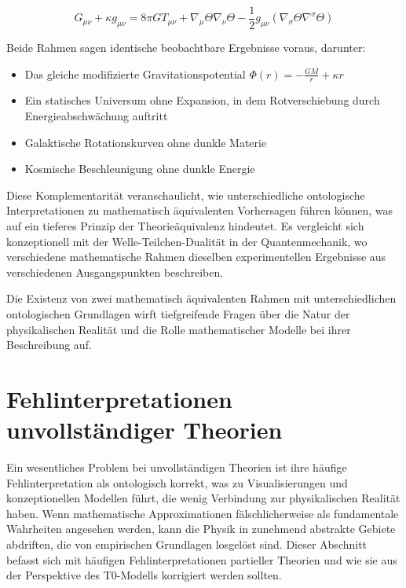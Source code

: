\documentclass[12pt,a4paper]{article}
\begin{document}
	\begin{equation}
		G_{\mu\nu} + \kappa g_{\mu\nu} = 8\pi G T_{\mu\nu} + \nabla_{\mu}\Theta\nabla_{\nu}\Theta - \frac{1}{2}g_{\mu\nu}(\nabla_{\sigma}\Theta\nabla^{\sigma}\Theta)
		\label{eq:modified_einstein}
	\end{equation}
	
	Beide Rahmen sagen identische beobachtbare Ergebnisse voraus, darunter:
	
	\begin{itemize}
		\item Das gleiche modifizierte Gravitationspotential $\Phi(r) = -\frac{GM}{r} + \kappa r$
		\item Ein statisches Universum ohne Expansion, in dem Rotverschiebung durch Energieabschwächung auftritt
		\item Galaktische Rotationskurven ohne dunkle Materie
		\item Kosmische Beschleunigung ohne dunkle Energie
	\end{itemize}
	
	Diese Komplementarität veranschaulicht, wie unterschiedliche ontologische Interpretationen zu mathematisch äquivalenten Vorhersagen führen können, was auf ein tieferes Prinzip der Theorieäquivalenz hindeutet. Es vergleicht sich konzeptionell mit der Welle-Teilchen-Dualität in der Quantenmechanik, wo verschiedene mathematische Rahmen dieselben experimentellen Ergebnisse aus verschiedenen Ausgangspunkten beschreiben.
	
	Die Existenz von zwei mathematisch äquivalenten Rahmen mit unterschiedlichen ontologischen Grundlagen wirft tiefgreifende Fragen über die Natur der physikalischen Realität und die Rolle mathematischer Modelle bei ihrer Beschreibung auf.
	
	\section{Fehlinterpretationen unvollständiger Theorien}
	\label{sec:misinterpretations}
	
	Ein wesentliches Problem bei unvollständigen Theorien ist ihre häufige Fehlinterpretation als ontologisch korrekt, was zu Visualisierungen und konzeptionellen Modellen führt, die wenig Verbindung zur physikalischen Realität haben. Wenn mathematische Approximationen fälschlicherweise als fundamentale Wahrheiten angesehen werden, kann die Physik in zunehmend abstrakte Gebiete abdriften, die von empirischen Grundlagen losgelöst sind. Dieser Abschnitt befasst sich mit häufigen Fehlinterpretationen partieller Theorien und wie sie aus der Perspektive des T0-Modells korrigiert werden sollten.
	
\end{document}
